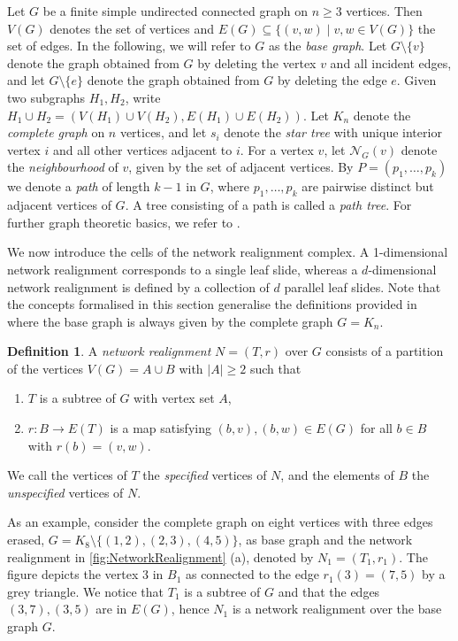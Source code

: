 \documentclass[reqno,dvipsnames]{amsart}
\theoremstyle{plain}
\numberwithin{equation}{section}
\theoremstyle{definition}
\newtheorem{definition}[theorem]{Definition}
\begin{document}
Let $G$ be a finite simple undirected connected graph on $n\geq 3$ vertices. Then $V(G)$ denotes the set of vertices and $E(G)\subseteq \{(v,w)\mid v,w\in V(G)\}$ the set of edges. In the following, we will refer to $G$ as the \textit{base graph}. Let $G\setminus \{v\}$ denote the graph obtained from $G$ by deleting the vertex $v$ and all incident edges, and let $G\setminus \{e\}$ denote the graph obtained from $G$ by deleting the edge $e$. Given two subgraphs $H_1,H_2$, write $H_1\cup H_2 = (V(H_1) \cup V(H_2), E(H_1)\cup E(H_2))$. Let $K_n$ denote the \textit{complete graph} on $n$ vertices, and let $s_i$ denote the \textit{star tree} with unique interior vertex $i$ and all other vertices adjacent to $i$. For a vertex $v$, let $\mathcal{N}_G(v)$ denote the \textit{neighbourhood} of $v$, given by the set of adjacent vertices. By $P=(p_1,\dots,p_k)$ we denote a \textit{path} of length $k-1$ in $G$, where $p_1,\dots,p_k$ are pairwise distinct but adjacent vertices of $G$. A tree consisting of a path is called a \textit{path tree}. For further graph theoretic basics, we refer to \cite{Diestel}.

We now introduce the cells of the network realignment complex. A 1-dimensional network realignment corresponds to a single leaf slide, whereas a $d$-dimensional network realignment is defined by a collection of $d$ parallel leaf slides. Note that the concepts formalised in this section generalise the definitions provided in \cite{Kozlov25} where the base graph is always given by the complete graph $G=K_n$. 

\begin{definition}
	A \textit{network realignment} $N = (T, r)$ over $G$ consists of a partition of the vertices $V(G) = A\cup B$ with $|A| \geq 2$ such that
	\begin{enumerate}[label=\roman*), itemsep=3pt, topsep=6pt]
		\item $T$ is a subtree of $G$ with vertex set $A$,
		\item $r\colon B\to E(T)$ is a map satisfying $(b,v),(b,w) \in E(G)$ for all $b\in B$ with $r(b) = (v,w)$.
	\end{enumerate}
	We call the vertices of $T$ the \textit{specified} vertices of $N$, and the elements of $B$ the \textit{unspecified} vertices of $N$.
\end{definition}

As an example, consider the complete graph on eight vertices with three edges erased, $G=K_8\setminus \{(1,2),(2,3),(4,5)\}$, as base graph and the network realignment in \autoref{fig:NetworkRealignment} (a), denoted by $N_1=(T_1,r_1)$. The figure depicts the vertex 3 in $B_1$ as connected to the edge $r_1(3)=(7,5)$ by a grey triangle. We notice that $T_1$ is a subtree of $G$ and that the edges $(3,7),(3,5)$ are in $E(G)$, hence $N_1$ is a network realignment over the base graph $G$. 
\end{document}
